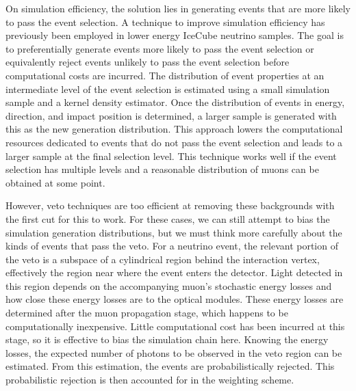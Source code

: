 On simulation efficiency, the solution lies in generating events that are more likely to pass the event selection.
A technique to improve simulation efficiency has previously been employed in lower energy IceCube neutrino samples.
The goal is to preferentially generate events more likely to pass the event selection or equivalently reject events unlikely to pass the event selection before computational costs are incurred.
The distribution of event properties at an intermediate level of the event selection is estimated using a small simulation sample and a kernel density estimator.
Once the distribution of events in energy, direction, and impact position is determined, a larger sample is generated with this as the new generation distribution.
This approach lowers the computational resources dedicated to events that do not pass the event selection and leads to a larger sample at the final selection level.
This technique works well if the event selection has multiple levels and a reasonable distribution of muons can be obtained at some point.

However, veto techniques are too efficient at removing these backgrounds with the first cut for this to work.
For these cases, we can still attempt to bias the simulation generation distributions, but we must think more carefully about the kinds of events that pass the veto.
For a neutrino event, the relevant portion of the veto is a subspace of a cylindrical region behind the interaction vertex, effectively the region near where the event enters the detector.
Light detected in this region depends on the accompanying muon's stochastic energy losses and how close these energy losses are to the optical modules.
These energy losses are determined after the muon propagation stage, which happens to be computationally inexpensive.
Little computational cost has been incurred at this stage, so it is effective to bias the simulation chain here.
Knowing the energy losses, the expected number of photons to be observed in the veto region can be estimated.
From this estimation, the events are probabilistically rejected.
This probabilistic rejection is then accounted for in the weighting scheme.

